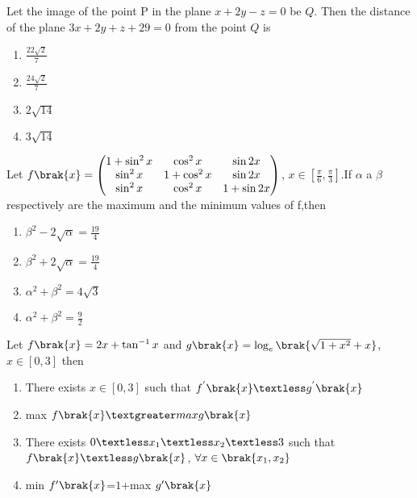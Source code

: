 \iffalse
\title{Assignment 3}
\author{AI24BTECH11018}
\section{mcq-single}
\fi

\item Let the image of the point P in the plane $x+2y-z=0$ be $Q$. Then the distance of the plane 
$3x + 2y + z + 29 = 0$ from the point $Q$ is
\hfill{}
\begin{enumerate}
    \item $\frac{22\sqrt{2}}{7}$
    \item $\frac{24\sqrt{2}}{7}$
    \item $2\sqrt{14}$
    \item $3\sqrt{14}$
\end{enumerate}
\item Let $f\brak{x}=\begin{pmatrix}
1+\sin^2{x} & \cos^2{x} & \sin 2x \\
\sin^2{x} & 1+\cos^2{x} & \sin 2x \\
\sin^2{x} & \cos^2{x} & 1+\sin 2x
\end{pmatrix}$, $x\in [\frac{\pi}{6},\frac{\pi}{3}]$.If $\alpha$ a $\beta$ respectively are the maximum and the minimum values of f,then
\hfill{}
\begin{enumerate}
    \item $\beta^2-2\sqrt{\alpha}=\frac{19}{4}$
    \item $\beta^2+2\sqrt{\alpha}=\frac{19}{4}$
    \item $\alpha^2 + \beta^2 = 4\sqrt{3}$
    \item $\alpha^2 + \beta^2 = \frac{9}{2}$
\end{enumerate}
\item Let $f\brak{x}=2x+\tan^{-1}x$ and $g\brak{x}=\log_{e}\brak{\sqrt{1+x^2}+x}$, $x\in [0,3]$ then 
\hfill{}
\begin{enumerate}
    \item There exists $x\in [0,3]$ such that $f^{'}\brak{x} \textless g^{'}\brak{x}$
    \item max $f\brak{x} \textgreater max g\brak{x}$
    \item There exists $0 \textless x_1 \textless x_2\textless 3$ such that $f\brak{x} \textless g\brak{x}$, $\forall x\in \brak{x_1,x_2}$
    \item min $f^{\prime}\brak{x}$=$1$+max $ g^{\prime} \brak{x}$
\end{enumerate}


